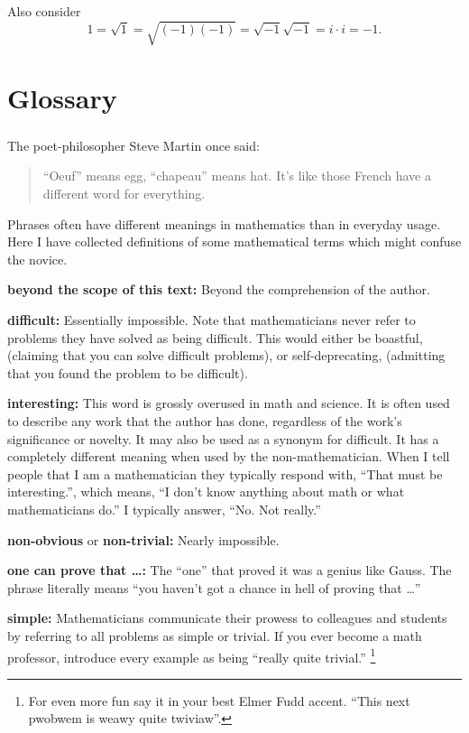 Also consider
\begin{equation*}
1 = \sqrt{1} = \sqrt{(-1)(-1)} = \sqrt{-1}\sqrt{-1}=i \cdot i = -1.
\end{equation*}
\raggedbottom
\chapter{Glossary}
\flushbottom


\paragraph{}

The poet-philosopher Steve Martin once said:
\begin{quotation}
``Oeuf'' means egg, ``chapeau'' means hat. It's like those French
have a different word for everything.
\end{quotation}

Phrases often have different meanings in mathematics than in everyday usage.
Here I have collected definitions of some mathematical terms which might
confuse the novice.


\begin{description}
\item{\textbf{beyond the scope of this text:}}
  Beyond the comprehension of the author.
\item{\textbf{difficult:}}
  Essentially impossible.  Note that mathematicians never refer to problems 
  they have solved as being difficult.  This would either be boastful, 
  (claiming that you can solve difficult problems), or self-deprecating,
  (admitting that you found the problem to be difficult).
\item{\textbf{interesting:}}
  This word is grossly overused in math and science.
  It is often used to describe any work that the author has done, regardless 
  of the work's significance or novelty.
  It may also be used as a synonym for difficult.
  It has a completely different meaning when used by the non-mathematician.
  When I tell people that I am a mathematician they typically respond 
  with, ``That must be interesting.'', which means, ``I don't know 
  anything about math or what mathematicians do.''  I typically answer,
  ``No.  Not really.''  
\item{\textbf{non-obvious} or \textbf{non-trivial:}}
  Nearly impossible.
\item{\textbf{one can prove that \ldots:}}
  The ``one'' that proved it was a genius like Gauss.  The phrase literally 
  means ``you haven't got a chance in hell of proving that \ldots''
\item{\textbf{simple:}}
  Mathematicians communicate their prowess to colleagues and students by 
  referring to all problems as simple or trivial.  If you ever become a math
  professor, introduce every example as being ``really quite trivial.''
  \footnote{For even more fun say it in your best Elmer Fudd accent.
    ``This next pwobwem is weawy quite twiviaw''.}
\end{description}



